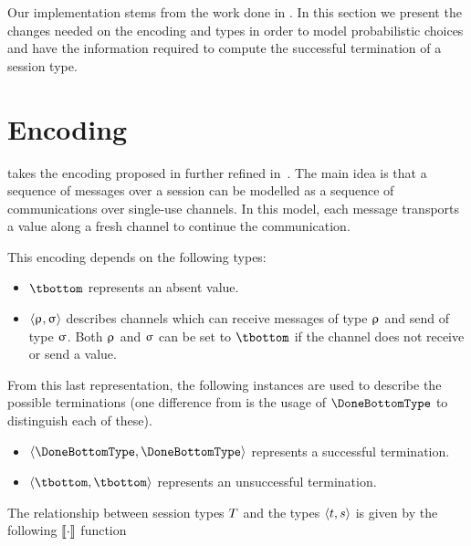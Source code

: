 Our implementation stems from the work done in \FuSe. In this section we present
the changes needed on the encoding and types in order to model probabilistic
choices and have the information required to compute the successful termination
of a session type.

\section{Encoding}

\FuSe takes the encoding proposed in \cite{Dardha} further refined
in~\cite{DBLP:journals/jfp/Padovani17}. The main idea is that a sequence of
messages over a session can be modelled as a sequence of communications over
single-use channels. In this model, each message transports a value along a
fresh channel to continue the communication.

This encoding depends on the following types:

\begin{itemize}
	\item $\tbottom$ represents an absent value.
	\item $\langle\uprho_{},\upsigma_{}\rangle$ describes channels which can
		receive messages of type $\uprho_{}$ and send of type $\upsigma_{}$. Both
		$\uprho_{}$ and $\upsigma_{}$ can be set to $\tbottom$ if the channel does not
		receive or send a value.
\end{itemize}

From this last representation, the following instances are used to describe the
possible terminations (one difference from \FuSe is the usage of
$\DoneBottomType$ to distinguish each of these).

\begin{itemize}
	\item $\tsession{\DoneBottomType}{\DoneBottomType}$ represents a successful
	termination.
	\item $\tsession{\tbottom}{\tbottom}$ represents an unsuccessful
	termination.
\end{itemize}

The relationship between session types $T$ and the types
$\langle t,s\rangle$ is given by the following $\llbracket\cdot\rrbracket$ function

